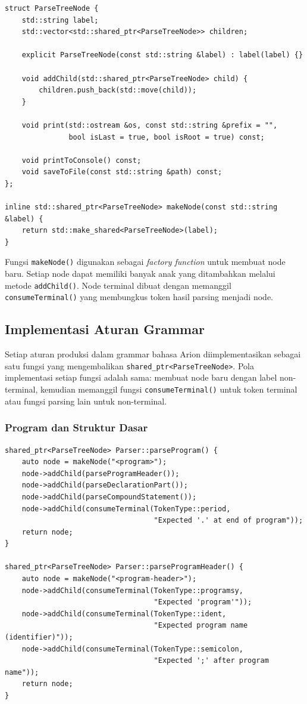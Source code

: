 \documentclass[12pt,a4paper]{article}
\begin{document}
\begin{lstlisting}[style=cpp, caption={Struktur data ParseTreeNode}]
struct ParseTreeNode {
    std::string label;
    std::vector<std::shared_ptr<ParseTreeNode>> children;

    explicit ParseTreeNode(const std::string &label) : label(label) {}

    void addChild(std::shared_ptr<ParseTreeNode> child) {
        children.push_back(std::move(child));
    }

    void print(std::ostream &os, const std::string &prefix = "",
               bool isLast = true, bool isRoot = true) const;

    void printToConsole() const;
    void saveToFile(const std::string &path) const;
};

inline std::shared_ptr<ParseTreeNode> makeNode(const std::string &label) {
    return std::make_shared<ParseTreeNode>(label);
}
\end{lstlisting}

Fungsi \texttt{makeNode()} digunakan sebagai \textit{factory function} untuk membuat node baru. Setiap node dapat memiliki banyak anak yang ditambahkan melalui metode \texttt{addChild()}. Node terminal dibuat dengan memanggil \texttt{consumeTerminal()} yang membungkus token hasil parsing menjadi node.

\subsection{Implementasi Aturan Grammar}

Setiap aturan produksi dalam grammar bahasa Arion diimplementasikan sebagai satu fungsi yang mengembalikan \texttt{shared\_ptr<ParseTreeNode>}. Pola implementasi setiap fungsi adalah sama: membuat node baru dengan label non-terminal, kemudian memanggil fungsi \texttt{consumeTerminal()} untuk token terminal atau fungsi parsing lain untuk non-terminal.

\subsubsection{Program dan Struktur Dasar}

\begin{lstlisting}[style=cpp, caption={Implementasi aturan <program> dan <program-header>}]
shared_ptr<ParseTreeNode> Parser::parseProgram() {
    auto node = makeNode("<program>");
    node->addChild(parseProgramHeader());
    node->addChild(parseDeclarationPart());
    node->addChild(parseCompoundStatement());
    node->addChild(consumeTerminal(TokenType::period,
                                   "Expected '.' at end of program"));
    return node;
}

shared_ptr<ParseTreeNode> Parser::parseProgramHeader() {
    auto node = makeNode("<program-header>");
    node->addChild(consumeTerminal(TokenType::programsy,
                                   "Expected 'program'"));
    node->addChild(consumeTerminal(TokenType::ident,
                                   "Expected program name (identifier)"));
    node->addChild(consumeTerminal(TokenType::semicolon,
                                   "Expected ';' after program name"));
    return node;
}
\end{lstlisting}
\end{document}
